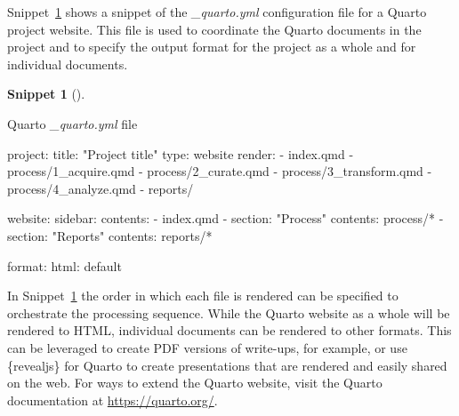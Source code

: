 \documentclass[
  letterpaper,
  krantz1]{latex/krantz-mod}
\newenvironment{Shaded}{\begin{snugshade}}{\end{snugshade}}
\newcommand{\AttributeTok}[1]{\textcolor[rgb]{0.00,0.00,0.00}{#1}}
\newcommand{\FunctionTok}[1]{\textcolor[rgb]{0.00,0.00,0.00}{#1}}
\newcommand{\KeywordTok}[1]{\textcolor[rgb]{0.00,0.00,0.00}{#1}}
\newcommand{\StringTok}[1]{\textcolor[rgb]{0.00,0.00,0.00}{#1}}
\theoremstyle{definition}
\newtheorem{definition}{Snippet}[chapter]
\theoremstyle{definition}
\theoremstyle{remark}
\begin{document}
Snippet~\ref{def-quarto-yml} shows a snippet of the \emph{\_quarto.yml}
configuration file for a Quarto project website. This file is used to
coordinate the Quarto documents in the project and to specify the output
format for the project as a whole and for individual documents.

\begin{definition}[]\protect\hypertarget{def-quarto-yml}{}\label{def-quarto-yml}

Quarto \emph{\_quarto.yml} file

\begin{Shaded}
\begin{Highlighting}[]
\FunctionTok{project}\KeywordTok{:}
\AttributeTok{  }\FunctionTok{title}\KeywordTok{:}\AttributeTok{ }\StringTok{"Project title"}
\AttributeTok{  }\FunctionTok{type}\KeywordTok{:}\AttributeTok{ website}
\AttributeTok{  }\FunctionTok{render}\KeywordTok{:}
\AttributeTok{    }\KeywordTok{{-}}\AttributeTok{ index.qmd}
\AttributeTok{    }\KeywordTok{{-}}\AttributeTok{ process/1\_acquire.qmd}
\AttributeTok{    }\KeywordTok{{-}}\AttributeTok{ process/2\_curate.qmd}
\AttributeTok{    }\KeywordTok{{-}}\AttributeTok{ process/3\_transform.qmd}
\AttributeTok{    }\KeywordTok{{-}}\AttributeTok{ process/4\_analyze.qmd}
\AttributeTok{    }\KeywordTok{{-}}\AttributeTok{ reports/}

\FunctionTok{website}\KeywordTok{:}
\AttributeTok{  }\FunctionTok{sidebar}\KeywordTok{:}
\AttributeTok{    }\FunctionTok{contents}\KeywordTok{:}
\AttributeTok{      }\KeywordTok{{-}}\AttributeTok{ index.qmd}
\AttributeTok{      }\KeywordTok{{-}}\AttributeTok{ }\FunctionTok{section}\KeywordTok{:}\AttributeTok{ }\StringTok{"Process"}
\AttributeTok{        }\FunctionTok{contents}\KeywordTok{:}\AttributeTok{ process/*}
\AttributeTok{      }\KeywordTok{{-}}\AttributeTok{ }\FunctionTok{section}\KeywordTok{:}\AttributeTok{ }\StringTok{"Reports"}
\AttributeTok{        }\FunctionTok{contents}\KeywordTok{:}\AttributeTok{ reports/*}

\FunctionTok{format}\KeywordTok{:}
\AttributeTok{  }\FunctionTok{html}\KeywordTok{:}\AttributeTok{ default}
\end{Highlighting}
\end{Shaded}

\end{definition}

In Snippet~\ref{def-quarto-yml} the order in which each file is rendered
can be specified to orchestrate the processing sequence. While the
Quarto website as a whole will be rendered to
HTML, individual documents can
be rendered to other formats. This can be leveraged to create
PDF versions of write-ups, for
example, or use \{revealjs\} for Quarto to create presentations that are
rendered and easily shared on the web. For ways to extend the Quarto
website, visit the Quarto documentation at \url{https://quarto.org/}.
\end{document}
